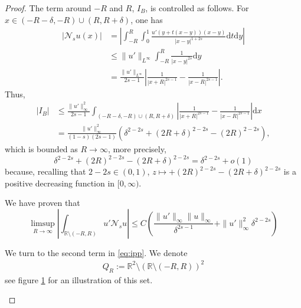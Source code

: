 \documentclass[11pt,a4paper]{amsart}
\newcommand{\R}{\mathbb{R}}
\newcommand{\Ns}{\mathcal{N}_s}
\newcommand{\dx}{\mathrm{d}x}
\newcommand{\dy}{\mathrm{d}y}
\newcommand{\dt}{\mathrm{d}t}
\begin{document}
\begin{proof}
The term around $-R$ and $R$, $I_B$, is controlled as follows. For $x\in (-R-\delta, -R)\cup (R, R+\delta)$, one has
\begin{align*}
|\Ns u(x)| &= \left| \int_{-R}^{R} \int_0^1 \frac{u'(y + t(x-y))(x-y)}{|x-y|^{1+2s}}\dt \dy\right| \\
&\leq \|u'\|_{L^{\infty}} \int_{-R}^R \frac{1}{|x-y|^{2s}} \dy\\
&= \frac{\|u'\|_{L^{\infty}}}{2s-1} \left| \frac{1}{|x+R|^{2s	-1}} - \frac{1}{|x-R|^{2s-1}}\right|.
\end{align*}
Thus,
\begin{align*}
|I_B| &\leq \frac{\|u'\|_{\infty}^2}{2s-1}\int_{(-R-\delta, -R) \cup (R, R+\delta)}\left| \frac{1}{|x+R|^{2s	-1}} - \frac{1}{|x-R|^{2s-1}}\right| \dx\\
&= \frac{\|u'\|_{\infty}^2}{(1-s)(2s-1)} (\delta^{2-2s} + (2R + \delta)^{2-2s} - (2R)^{2-2s}),
\end{align*}
which is bounded as $R\rightarrow \infty$, more precisely, 
\[\delta^{2-2s} + (2R)^{2-2s} - (2R + \delta)^{2-2s} = \delta^{2-2s} + o(1)\]
because, recalling that $2-2s\in (0,1)$, $z\mapsto + (2R)^{2-2s} - (2R + \delta)^{2-2s} $ is a positive decreasing function in $[0,\infty)$.

We have proven that 
\[\limsup_{R\rightarrow \infty} \left| \int_{\R \setminus (-R,R)} u' \Ns u  \right| \leq C\left(\frac{\|u'\|_{\infty} \|u\|_{\infty}}{\delta^{2s-1}} + \|u'\|_{\infty}^2 \delta^{2-2s}\right)\]

We turn to the second term in \eqref{eq:ipp}. We denote
\begin{align*}
Q_R := \R^2 \setminus (\R \setminus (-R,R))^2
\end{align*}
see figure \ref{fig:regions} for an illustration of this set. 

\begin{figure}
\label{fig:regions}
\end{figure}
\end{proof}
\end{document}
